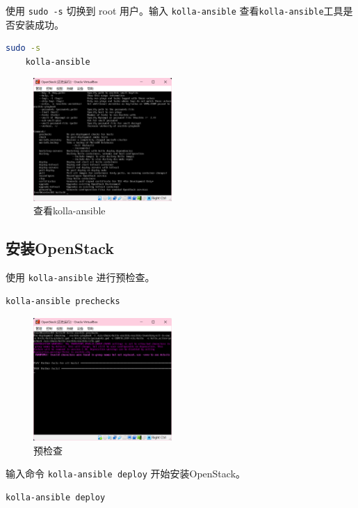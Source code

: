 \documentclass{article}
\begin{document}
使用 \texttt{sudo -s} 切换到 root 用户。输入 \texttt{kolla-ansible} 查看\texttt{kolla-ansible}工具是否安装成功。

\begin{lstlisting}[language=bash]
    sudo -s
    kolla-ansible
\end{lstlisting}

\begin{figure}[H]
    \centering
    \includegraphics[width=0.47\textwidth]{img/6.5.png}
    \caption{查看kolla-ansible}
\end{figure}

\subsection{安装OpenStack}

使用 \texttt{kolla-ansible} 进行预检查。

\begin{lstlisting}[language=bash]
    kolla-ansible prechecks
\end{lstlisting}

\begin{figure}[H]
    \centering
    \includegraphics[width=0.47\textwidth]{img/7.1.png}
    \caption{预检查}
\end{figure}

输入命令 \texttt{kolla-ansible deploy} 开始安装OpenStack。

\begin{lstlisting}[language=bash]
    kolla-ansible deploy
\end{lstlisting}
\end{document}
